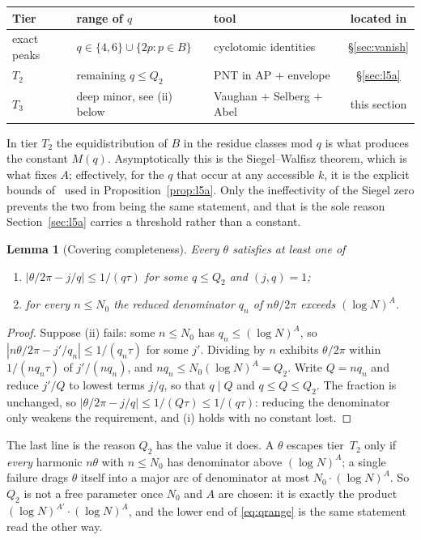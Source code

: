 \documentclass[11pt,a4paper]{article}
\theoremstyle{plain}
\newtheorem{lemma}[theorem]{Lemma}
\theoremstyle{definition}
\theoremstyle{remark}
\begin{document}
\begin{center}
\begin{tabular}{@{}lllc@{}}
\toprule
Tier & range of $q$ & tool & located in\\
\midrule
exact peaks & $q\in\{4,6\}\cup\{2p:p\in B\}$ & cyclotomic identities & \S\ref{sec:vanish}\\
$T_2$ & remaining $q\le Q_2$ & PNT in AP $+$ envelope & \S\ref{sec:l5a}\\
$T_3$ & deep minor, see (ii) below & Vaughan $+$ Selberg $+$ Abel & this section\\
\bottomrule
\end{tabular}
\end{center}

\noindent
In tier $T_2$ the equidistribution of $B$ in the residue classes mod $q$ is what
produces the constant $M(q)$. Asymptotically this is the Siegel--Walfisz
theorem, which is what fixes $A$; effectively, for the $q$ that occur at any
accessible $k$, it is the explicit bounds of~\cite{BMOR18} used in
Proposition~\ref{prop:l5a}. Only the ineffectivity of the Siegel zero prevents
the two from being the same statement, and that is the sole reason
Section~\ref{sec:l5a} carries a threshold rather than a constant.

\begin{lemma}[Covering completeness]\label{lem:cover}
Every $\theta$ satisfies at least one of
\begin{enumerate}
\item[(i)] $|\theta/2\pi-j/q|\le1/(q\tau)$ for some $q\le Q_2$ and $(j,q)=1$;
\item[(ii)] for every $n\le N_0$ the reduced denominator $q_n$ of $n\theta/2\pi$
      exceeds $(\log N)^{A}$.
\end{enumerate}
\end{lemma}

\begin{proof}
Suppose (ii) fails: some $n\le N_0$ has $q_n\le(\log N)^{A}$, so
$|n\theta/2\pi-j'/q_n|\le1/(q_n\tau)$ for some $j'$. Dividing by $n$ exhibits
$\theta/2\pi$ within $1/(nq_n\tau)$ of $j'/(nq_n)$, and
$nq_n\le N_0(\log N)^{A}=Q_2$. Write $Q=nq_n$ and reduce $j'/Q$ to lowest terms
$j/q$, so that $q\mid Q$ and $q\le Q\le Q_2$. The fraction is unchanged, so
$|\theta/2\pi-j/q|\le1/(Q\tau)\le1/(q\tau)$: reducing the denominator only
weakens the requirement, and (i) holds with no constant lost.
\end{proof}

\noindent
The last line is the reason $Q_2$ has the value it does. A $\theta$ escapes
tier~$T_2$ only if \emph{every} harmonic $n\theta$ with $n\le N_0$ has
denominator above $(\log N)^{A}$; a single failure drags $\theta$ itself into a
major arc of denominator at most $N_0\cdot(\log N)^{A}$. So $Q_2$ is not a free
parameter once $N_0$ and $A$ are chosen: it is exactly the product
$(\log N)^{A'}\cdot(\log N)^{A}$, and the lower end of \eqref{eq:qrange} is the
same statement read the other way.
\end{document}
